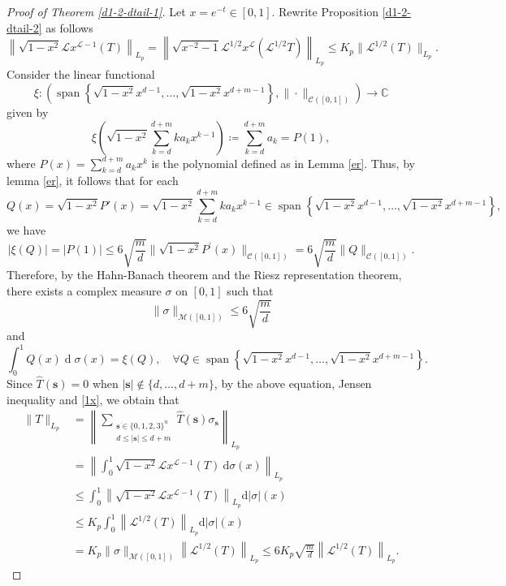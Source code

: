 \documentclass{amsbook}
\theoremstyle{definition}
\theoremstyle{remark}
\numberwithin{section}{chapter}
\numberwithin{equation}{chapter}
\newcommand{\1}{\mathbf{1}}
\begin{document}
\begin{proof}[Proof of Theorem \ref{d1-2-dtail-1}] 
Let $x=e^{-t}\in[0,1]$. Rewrite Proposition \ref{d1-2-dtail-2}  as follows 
\begin{equation}\label{1x}
\left\|\sqrt{1-x^{2}} \mathcal{L} x^{\mathcal{L}-1} (T)\right\|_{L_{p}} =	\left\|\sqrt{x^{-2}-1} \mathcal{L}^{1/2} x^{\mathcal{L}} (\mathcal{L}^{1/2} T)\right\|_{L_{p}} 	\leq K_p\|\mathcal{L}^{1 / 2} (T)\|_{L_{p}}. 
\end{equation}
Consider the linear functional
$$
\xi:\left(\operatorname{span}\left\{\sqrt{1-x^{2}} x^{d-1}, \ldots, \sqrt{1-x^{2}} x^{d+m-1}\right\},\|\cdot\|_{\mathcal{C}([0,1])}\right) \rightarrow \mathbb{C}
$$
given by
\[
\xi\left(\sqrt{1-x^{2}} \sum_{k=d}^{d+m} k a_{k} x^{k-1}\right)\coloneqq\sum_{k=d}^{d+m} a_{k} =P(1),
\]
where $P(x)=\sum_{k=d}^{d+m}a_kx^k$ is the polynomial defined as in Lemma \ref{er}. Thus, by lemma \ref{er}, it follows that for each
\[
Q(x)=\sqrt{1-x^{2}}P'(x)
=\sqrt{1-x^{2}}
\sum_{k=d}^{d+m}ka_kx^{k-1}\in \operatorname{span}\left\{\sqrt{1-x^{2}} x^{d-1}, \ldots, \sqrt{1-x^{2}} x^{d+m-1}\right\},
\]
we have 
$$
|\xi(Q)|=|P(1)|\leq 6\sqrt{\frac{m}{d}}\|\sqrt{1-x^{2}}P^{\prime}(x)\|_{\mathcal{C}([0,1])}=6 \sqrt{\frac{m}{d}}\|Q\|_{\mathcal{C}([0,1])}.
$$
Therefore, by the Hahn-Banach theorem and the Riesz representation theorem, there exists a complex measure $\sigma$ on $[0,1]$ such that $$\|\sigma\|_{\mathcal{M}([0,1])} \leq 6 \sqrt{\frac{m}{d}}$$ and
$$\int_{0}^{1} Q(x) \operatorname{d} \sigma(x)=\xi(Q),\quad\forall Q \in \operatorname{span}\left\{\sqrt{1-x^{2}} x^{d-1}, \ldots, \sqrt{1-x^{2}} x^{d+m-1}\right\}. $$
Since $\widehat{T}(\mathbf{s})=0$ when $|\mathbf{s}| \notin\{d, \ldots, d+m\}$, by the above equation, Jensen inequality and \eqref{1x}, we obtain that
\begin{align*}
 \|T\|_{L_{p}}&=\left\|\sum_{\substack{\mathbf{s}\in\{0,1,2,3\}^n\\d\leq|\mathbf{s}|\leq d+m}}\widehat{T}(\mathbf{s})\sigma_\mathbf{s}\right\|_{L_{p}}\\
&=\left\|\int_{0}^{1} \sqrt{1-x^{2}} \mathcal{L} x^{\mathcal{L}-1} (T) \mathrm{~d} \sigma(x)\right\|_{L_{p}}\\
& \leq \int_{0}^{1}\left\|\sqrt{1-x^{2}} \mathcal{L} x^{\mathcal{L}-1} (T)\right\|_{L_{p}}\mathrm{d}|\sigma|(x) \\
& \leq K_{p}\int_{0}^{1}\left\|\mathcal{L}^{1/2}(T)\right\|_{L_{p}} \mathrm{d}|\sigma|(x)  \\
&=K_{p}\|\sigma\|_{\mathcal{M}([0,1])}\left\|\mathcal{L}^{1/2}(T)\right\|_{L_{p}} \leq 6 K_p \sqrt{\frac{m}{d}}\left\|\mathcal{L}^{1 / 2}(T)\right\|_{L_{p}}.
\end{align*}
\end{proof}
\end{document}
